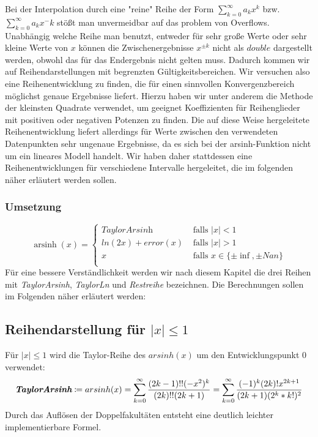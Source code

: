 \documentclass[course=erap] {aspdoc}
\begin{document}
     Bei der Interpolation durch eine "reine" Reihe der Form $\sum_{k=0}^{\infty} a_k x^k$ bzw. $\sum_{k=0}^{\infty} a_k x^-k$ stößt man unvermeidbar auf das problem von Overflows.
     Unabhängig welche Reihe man benutzt, entweder für sehr große Werte oder sehr kleine Werte von $x$ können die Zwischenergebnisse $x^{\pm k}$ nicht als $double$ dargestellt werden, obwohl das für das Endergebnis nicht gelten muss.
     Dadurch kommen wir auf Reihendarstellungen mit begrenzten Gültigkeitsbereichen.
     Wir versuchen also eine Reihenentwicklung zu finden, die für einen sinnvollen Konvergenzbereich möglichst genaue Ergebnisse liefert. Hierzu haben wir unter anderem die Methode der kleinsten Quadrate verwendet, um geeignet Koeffizienten für Reihenglieder mit positiven oder negativen Potenzen zu finden. Die auf diese Weise hergeleitete Reihenentwicklung liefert allerdings für Werte zwischen den verwendeten Datenpunkten sehr ungenaue Ergebnisse, da es sich bei der arsinh-Funktion nicht um ein lineares Modell handelt. Wir haben daher stattdessen eine Reihenentwicklungen für verschiedene Intervalle hergeleitet, die im folgenden näher erläutert werden sollen.
     \subsubsection{Umsetzung}
     
     \[ \operatorname{arsinh}(x) =
     \begin{cases}
        \textit{TaylorArsinh}     & \text{ falls } |x| < 1 \\
        ln(2x) + error(x)  & \text{ falls } |x| >1 \\
        x     & \text{ falls } x \in \{\pm\inf, \pm Nan\}\\
    \end{cases}\]
    Für eine bessere Verständlichkeit werden wir nach diesem Kapitel die drei Reihen mit \textit{TaylorArsinh}, \textit{TaylorLn} und \textit{Restreihe} bezeichnen.
    Die Berechnungen sollen im Folgenden näher erläutert werden:
    
    \subsection{Reihendarstellung für $|x|\leq 1$}
     Für $|x| \leq 1$ wird die Taylor-Reihe des $arsinh(x)$ um den Entwicklungspunkt 0 verwendet:
     \[
        \textit{\textbf{TaylorArsinh}}\coloneqq arsinh(x) = \sum_{k = 0}^{\infty} \frac{(2k-1)!!(-x^2)^k}{(2k)!!(2k + 1)}
         = \sum_{k = 0}^{\infty} \frac{(-1)^k(2k)!x^{2k + 1}}{(2k + 1)(2^k*k!)^2}
     \]
     Durch das Auflösen der Doppelfakultäten entsteht eine deutlich leichter implementierbare Formel.
\end{document}
